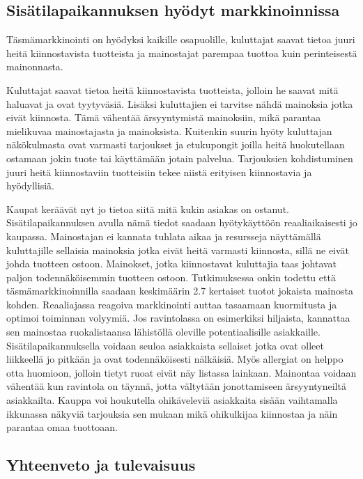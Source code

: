 \subsection{Sisätilapaikannuksen hyödyt markkinoinnissa}
Täsmämarkkinointi on hyödyksi kaikille osapuolille, kuluttajat saavat tietoa juuri heitä kiinnostavista tuotteista ja mainostajat parempaa tuottoa kuin perinteisestä mainonnasta.



Kuluttajat saavat tietoa heitä kiinnostavista tuotteista, jolloin he saavat mitä haluavat ja ovat tyytyväsiä. Lisäksi kuluttajien ei tarvitse nähdä mainoksia jotka eivät kiinnosta. Tämä vähentää ärsyyntymistä mainoksiin, mikä parantaa mielikuvaa mainostajasta ja mainoksista. Kuitenkin suurin hyöty kuluttajan näkökulmasta ovat varmasti tarjoukset ja etukupongit joilla heitä huokutellaan ostamaan jokin tuote tai käyttämään jotain palvelua. Tarjouksien kohdistuminen juuri heitä kiinnostaviin tuotteisiin tekee niistä erityisen kiinnostavia ja hyödyllisiä.
 

Kaupat keräävät nyt jo tietoa siitä mitä kukin asiakas on ostanut. Sisätilapaikannuksen avulla nämä tiedot saadaan hyötykäyttöön reaaliaikaisesti jo kaupassa.
Mainostajan ei kannata tuhlata aikaa ja resursseja näyttämällä kuluttajille sellaisia mainoksia jotka eivät heitä varmasti kiinnosta, sillä ne eivät johda tuotteen ostoon. Mainokset, jotka kiinnostavat kuluttajia taas johtavat paljon todennäköisemmin tuotteen ostoon. Tutkimuksessa\cite{target} onkin todettu että täsmämarkkinoinnilla saadaan keskimäärin 2.7 kertaiset tuotot jokaista mainosta kohden.
Reaaliajassa reagoiva markkinointi auttaa tasaamaan kuormitusta ja optimoi toiminnan volyymiä\cite{tasma}. Jos ravintolassa on esimerkiksi hiljaista, kannattaa sen mainostaa ruokalistaansa lähistöllä oleville potentiaalisille asiakkaille. Sisätilapaikannuksella voidaan seuloa asiakkaista sellaiset jotka ovat olleet liikkeellä jo pitkään ja ovat todennäköisesti nälkäisiä. Myös allergiat on helppo otta huomioon, jolloin tietyt ruoat eivät näy listassa lainkaan\cite{tasma}. Mainontaa voidaan vähentää kun ravintola on täynnä, jotta vältytään jonottamiseen ärsyyntyneiltä asiakkailta.
Kauppa voi houkutella ohikäveleviä asiakkaita sisään vaihtamalla ikkunassa näkyviä tarjouksia sen mukaan mikä ohikulkijaa kiinnostaa ja näin parantaa omaa tuottoaan.

\subsection{Yhteenveto ja tulevaisuus}

